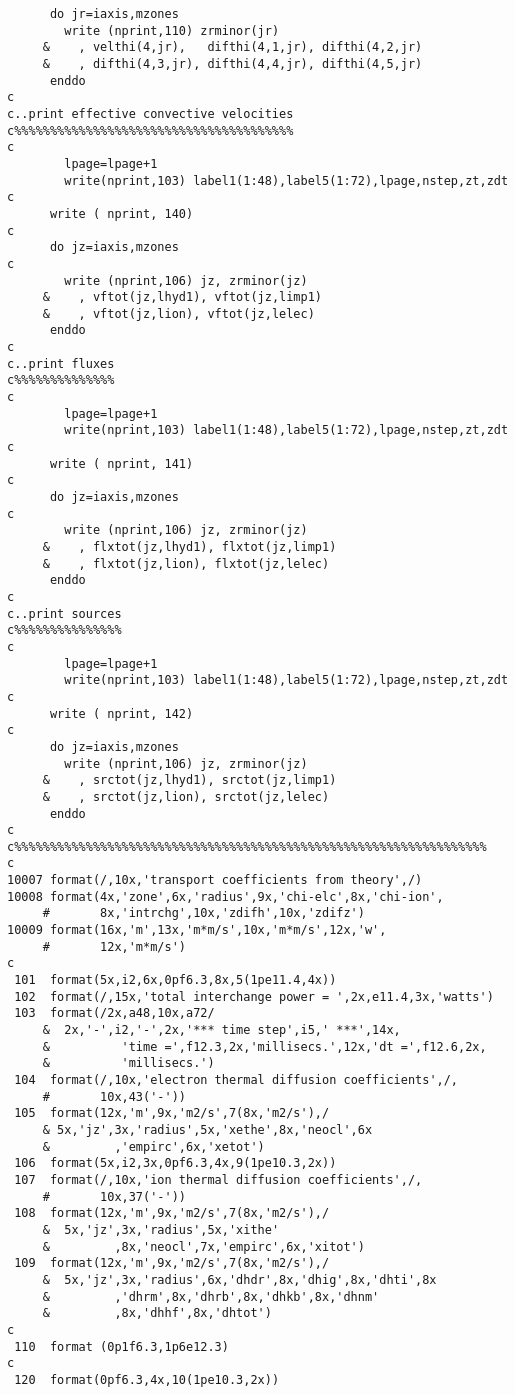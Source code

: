 \begin{verbatim}
      do jr=iaxis,mzones
        write (nprint,110) zrminor(jr)
     &    , velthi(4,jr),   difthi(4,1,jr), difthi(4,2,jr)
     &    , difthi(4,3,jr), difthi(4,4,jr), difthi(4,5,jr)
      enddo
c
c..print effective convective velocities
c%%%%%%%%%%%%%%%%%%%%%%%%%%%%%%%%%%%%%%%
c
        lpage=lpage+1
        write(nprint,103) label1(1:48),label5(1:72),lpage,nstep,zt,zdt
c
      write ( nprint, 140)
c
      do jz=iaxis,mzones
c
        write (nprint,106) jz, zrminor(jz)
     &    , vftot(jz,lhyd1), vftot(jz,limp1)
     &    , vftot(jz,lion), vftot(jz,lelec)
      enddo
c
c..print fluxes
c%%%%%%%%%%%%%%
c
        lpage=lpage+1
        write(nprint,103) label1(1:48),label5(1:72),lpage,nstep,zt,zdt
c
      write ( nprint, 141)
c
      do jz=iaxis,mzones
c
        write (nprint,106) jz, zrminor(jz)
     &    , flxtot(jz,lhyd1), flxtot(jz,limp1)
     &    , flxtot(jz,lion), flxtot(jz,lelec)
      enddo
c
c..print sources
c%%%%%%%%%%%%%%%
c
        lpage=lpage+1
        write(nprint,103) label1(1:48),label5(1:72),lpage,nstep,zt,zdt
c
      write ( nprint, 142)
c
      do jz=iaxis,mzones
        write (nprint,106) jz, zrminor(jz)
     &    , srctot(jz,lhyd1), srctot(jz,limp1)
     &    , srctot(jz,lion), srctot(jz,lelec)
      enddo
c
c%%%%%%%%%%%%%%%%%%%%%%%%%%%%%%%%%%%%%%%%%%%%%%%%%%%%%%%%%%%%%%%%%%
c
10007 format(/,10x,'transport coefficients from theory',/)
10008 format(4x,'zone',6x,'radius',9x,'chi-elc',8x,'chi-ion',
     #       8x,'intrchg',10x,'zdifh',10x,'zdifz')
10009 format(16x,'m',13x,'m*m/s',10x,'m*m/s',12x,'w',
     #       12x,'m*m/s')
c
 101  format(5x,i2,6x,0pf6.3,8x,5(1pe11.4,4x))
 102  format(/,15x,'total interchange power = ',2x,e11.4,3x,'watts')
 103  format(/2x,a48,10x,a72/
     &  2x,'-',i2,'-',2x,'*** time step',i5,' ***',14x,
     &          'time =',f12.3,2x,'millisecs.',12x,'dt =',f12.6,2x,
     &          'millisecs.')
 104  format(/,10x,'electron thermal diffusion coefficients',/,
     #       10x,43('-'))
 105  format(12x,'m',9x,'m2/s',7(8x,'m2/s'),/
     & 5x,'jz',3x,'radius',5x,'xethe',8x,'neocl',6x
     &         ,'empirc',6x,'xetot')
 106  format(5x,i2,3x,0pf6.3,4x,9(1pe10.3,2x))
 107  format(/,10x,'ion thermal diffusion coefficients',/,
     #       10x,37('-'))
 108  format(12x,'m',9x,'m2/s',7(8x,'m2/s'),/
     &  5x,'jz',3x,'radius',5x,'xithe'
     &         ,8x,'neocl',7x,'empirc',6x,'xitot')
 109  format(12x,'m',9x,'m2/s',7(8x,'m2/s'),/
     &  5x,'jz',3x,'radius',6x,'dhdr',8x,'dhig',8x,'dhti',8x
     &         ,'dhrm',8x,'dhrb',8x,'dhkb',8x,'dhnm'
     &         ,8x,'dhhf',8x,'dhtot')
c
 110  format (0p1f6.3,1p6e12.3)
c
 120  format(0pf6.3,4x,10(1pe10.3,2x))

\end{verbatim}
